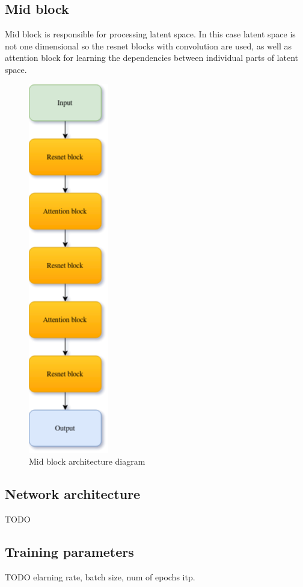 \documentclass[11pt,a4paper]{report}
\begin{document}
\subsection{Mid block}
Mid block is responsible for processing latent space. In this case latent space is not one dimensional so the resnet blocks with convolution are used, as well as attention block for learning the dependencies between individual parts of latent space.
\begin{figure}[H]
	\centering
	\includegraphics[scale=0.6]{images/MidBlock.drawio}
    \caption{Mid block architecture diagram}
\end{figure}

\subsection{Network architecture}
TODO
\subsection{Training parameters}
TODO elarning rate, batch size, num of epochs itp.
\end{document}
